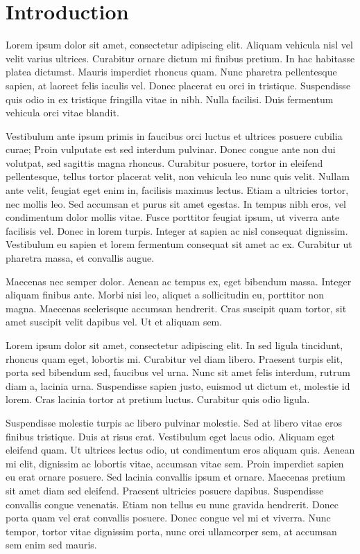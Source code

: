 \chapter{Introduction}


Lorem ipsum  dolor sit amet, consectetur adipiscing elit. Aliquam vehicula nisl vel velit varius ultrices. Curabitur ornare dictum mi finibus pretium. In hac habitasse platea dictumst. Mauris imperdiet rhoncus quam. Nunc pharetra pellentesque sapien, at laoreet felis iaculis vel. Donec placerat eu orci in tristique. Suspendisse quis odio in ex tristique fringilla vitae in nibh. Nulla facilisi. Duis fermentum vehicula orci vitae blandit.

Vestibulum ante ipsum primis in faucibus orci luctus et ultrices posuere cubilia curae; Proin vulputate est sed interdum pulvinar. Donec congue ante non dui volutpat, sed sagittis magna rhoncus. Curabitur posuere, tortor in eleifend pellentesque, tellus tortor placerat velit, non vehicula leo nunc quis velit. Nullam ante velit, feugiat eget enim in, facilisis maximus lectus. Etiam a ultricies tortor, nec mollis leo. Sed accumsan et purus sit amet egestas. In tempus nibh eros, vel condimentum dolor mollis vitae. Fusce porttitor feugiat ipsum, ut viverra ante facilisis vel. Donec in lorem turpis. Integer at sapien ac nisl consequat dignissim. Vestibulum eu sapien et lorem fermentum consequat sit amet ac ex. Curabitur ut pharetra massa, et convallis augue.

Maecenas nec semper dolor. Aenean ac tempus ex, eget bibendum massa. Integer aliquam finibus ante. Morbi nisi leo, aliquet a sollicitudin eu, porttitor non magna. Maecenas scelerisque accumsan hendrerit. Cras suscipit quam tortor, sit amet suscipit velit dapibus vel. Ut et aliquam sem.

Lorem ipsum dolor sit amet, consectetur adipiscing elit. In sed ligula tincidunt, rhoncus quam eget, lobortis mi. Curabitur vel diam libero. Praesent turpis elit, porta sed bibendum sed, faucibus vel urna. Nunc sit amet felis interdum, rutrum diam a, lacinia urna. Suspendisse sapien justo, euismod ut dictum et, molestie id lorem. Cras lacinia tortor at pretium luctus. Curabitur quis odio ligula.

Suspendisse molestie turpis ac libero pulvinar molestie. Sed at libero vitae eros finibus tristique. Duis at risus erat. Vestibulum eget lacus odio. Aliquam eget eleifend quam. Ut ultrices lectus odio, ut condimentum eros aliquam quis. Aenean mi elit, dignissim ac lobortis vitae, accumsan vitae sem. Proin imperdiet sapien eu erat ornare posuere. Sed lacinia convallis ipsum et ornare. Maecenas pretium sit amet diam sed eleifend. Praesent ultricies posuere dapibus. Suspendisse convallis congue venenatis. Etiam non tellus eu nunc gravida hendrerit. Donec porta quam vel erat convallis posuere. Donec congue vel mi et viverra. Nunc tempor, tortor vitae dignissim porta, nunc orci ullamcorper sem, at accumsan sem enim sed mauris. 

